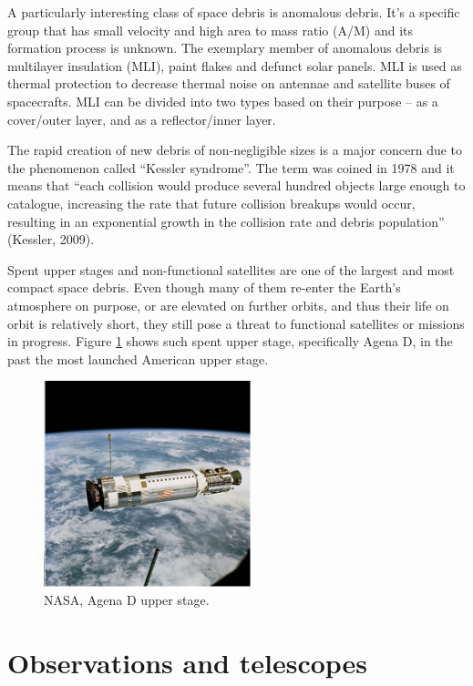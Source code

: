 	A particularly interesting class of space debris is anomalous debris. It's a specific group that has small velocity and high area to mass ratio (A/M) and its formation process is unknown. The exemplary member of anomalous debris is multilayer insulation (MLI),  paint flakes and defunct solar panels. MLI is used as thermal protection to decrease thermal noise on antennae and satellite buses of spacecrafts. MLI can be divided into two types based on their purpose – as a cover/outer layer, and as a reflector/inner layer.
	
	The rapid creation of new debris of non-negligible sizes is a major concern due to the phenomenon called “Kessler syndrome”. The term was coined in 1978 and it means that “each collision would produce several hundred objects large enough to catalogue, increasing the rate that future collision breakups would occur, resulting in an exponential growth in the collision rate and debris population” (Kessler, 2009).
	
	Spent upper stages and non-functional satellites are one of the largest and most compact space debris. Even though many of them re-enter the Earth's atmosphere on purpose, or are elevated on further orbits, and thus their life on orbit is relatively short, they still pose a threat to functional satellites or missions in progress. Figure \ref{fig:upperstage} shows such spent upper stage, specifically Agena D, in the past the most launched American upper stage.
	
\begin{figure}[H]
\centering
  \includegraphics[width=6cm]{images/upperstage}
  \caption{NASA, Agena D upper stage.}
  \label{fig:upperstage}
\end{figure}
	
\pagebreak


\section{Observations and telescopes}\label{sec:observations_telescopes}

